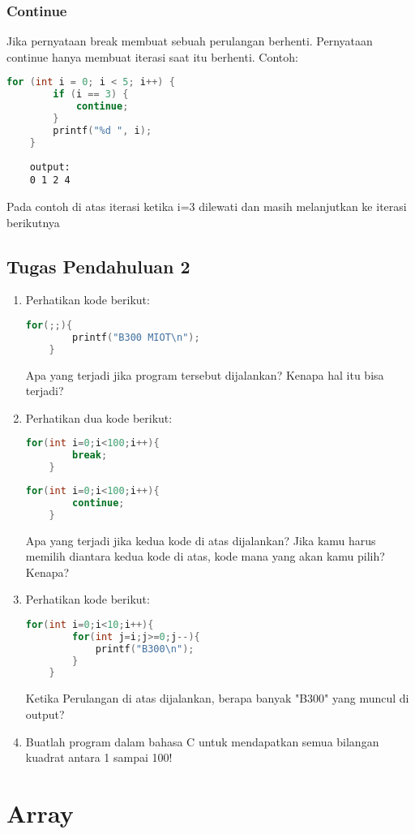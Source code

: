 \subsubsection{Continue}

Jika pernyataan break membuat sebuah perulangan berhenti.
Pernyataan continue hanya membuat iterasi saat itu berhenti.
Contoh:
\begin{lstlisting}[language=c]
	for (int i = 0; i < 5; i++) {
		if (i == 3) {
			continue;
		}
		printf("%d ", i);
	}
\end{lstlisting}
\begin{verbatim}
	output:
	0 1 2 4
\end{verbatim}
Pada contoh di atas iterasi ketika i=3 dilewati dan masih melanjutkan ke iterasi berikutnya

\subsection*{Tugas Pendahuluan 2}
\begin{enumerate}
	\item Perhatikan kode berikut:
	\begin{lstlisting}[language=c]
	for(;;){
		printf("B300 MIOT\n");
	}	
\end{lstlisting}
	Apa yang terjadi jika program tersebut dijalankan? Kenapa hal itu bisa terjadi?
	\item Perhatikan dua kode berikut:
	\begin{lstlisting}[language=c]
	for(int i=0;i<100;i++){
		break;
	}
\end{lstlisting}
\begin{lstlisting}[language=c]
	for(int i=0;i<100;i++){
		continue;
	}
\end{lstlisting}
Apa yang terjadi jika kedua kode di atas dijalankan?
Jika kamu harus memilih diantara kedua kode di atas, kode mana yang akan kamu pilih? Kenapa?
	\item Perhatikan kode berikut:
	\begin{lstlisting}[language=c]
	for(int i=0;i<10;i++){
		for(int j=i;j>=0;j--){
			printf("B300\n");
		}
	}
\end{lstlisting}
Ketika Perulangan di atas dijalankan, berapa banyak "B300" yang muncul di output?
	\item Buatlah program dalam bahasa C untuk mendapatkan semua bilangan kuadrat antara 1 sampai 100!
\end{enumerate}

\section{Array}

